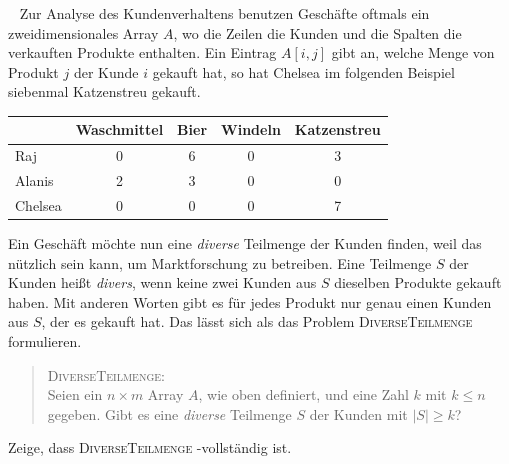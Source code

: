 \documentclass{uebung_cs}
\begin{document}
\begin{aufgabe}[Kundenanalyse]\
	Zur Analyse des Kundenverhaltens benutzen Geschäfte oftmals ein zweidimensionales Array $A$, wo die Zeilen die Kunden und die Spalten die verkauften Produkte enthalten. Ein Eintrag $A[i,j]$ gibt an, welche Menge von Produkt $j$ der Kunde $i$ gekauft hat, so hat Chelsea im folgenden Beispiel siebenmal Katzenstreu gekauft.
	
	\begin{center}
	\begin{tabular}{l c c c c}
	\hline 
	& Waschmittel & Bier & Windeln & Katzenstreu \\ 
	\hline 
	Raj & 0 & 6 & 0 & 3 \\ 
	Alanis & 2 & 3 & 0 & 0 \\ 
	Chelsea & 0 & 0 & 0 & 7 \\ 
	\hline 
	\end{tabular} 
	\end{center}
	
	Ein Geschäft möchte nun eine \textit{diverse} Teilmenge der Kunden finden, weil das nützlich sein kann, um Marktforschung zu betreiben. Eine Teilmenge $S$ der Kunden heißt \textit{divers}, wenn keine zwei Kunden aus $S$ dieselben Produkte gekauft haben. Mit anderen Worten gibt es für jedes Produkt nur genau einen Kunden aus $S$, der es gekauft hat. Das lässt sich als das Problem \textsc{DiverseTeilmenge} formulieren.
	\begin{quote}
		\textsc{DiverseTeilmenge}:\\
		Seien ein $n \times m$ Array $A$, wie oben definiert, und eine Zahl $k$ mit $k \leq n$ gegeben. Gibt es eine \textit{diverse} Teilmenge $S$ der Kunden mit $|S| \geq k$?
	\end{quote}
	Zeige, dass \textsc{DiverseTeilmenge} \NP-vollständig ist.
\end{aufgabe}    

	
\end{document}
